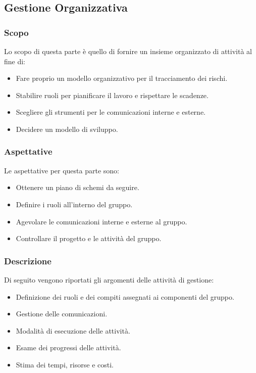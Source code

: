 \subsection{Gestione Organizzativa}
\subsubsection{Scopo}
Lo scopo di questa parte è quello di fornire un insieme organizzato di attività al fine di:
\begin{itemize}
    \item Fare proprio un modello organizzativo per il tracciamento dei rischi.
    \item Stabilire ruoli per pianificare il lavoro e rispettare le scadenze.
    \item Scegliere gli strumenti per le comunicazioni interne e esterne.
    \item Decidere un modello di sviluppo.
\end{itemize}

\subsubsection{Aspettative}
Le aspettative per questa parte sono:
\begin{itemize}
    \item Ottenere un piano di schemi da seguire.
    \item Definire i ruoli all'interno del gruppo.
    \item Agevolare le comunicazioni interne e esterne al gruppo.
    \item Controllare il progetto e le attività del gruppo.
\end{itemize}

\subsubsection{Descrizione}
Di seguito vengono riportati gli argomenti delle attività di gestione:
\begin{itemize}
    \item Definizione dei ruoli e dei compiti assegnati ai componenti del gruppo.
    \item Gestione delle comunicazioni.
    \item Modalità di esecuzione delle attività.
    \item Esame dei progressi delle attività.
    \item Stima dei tempi, risorse e costi.
\end{itemize}

